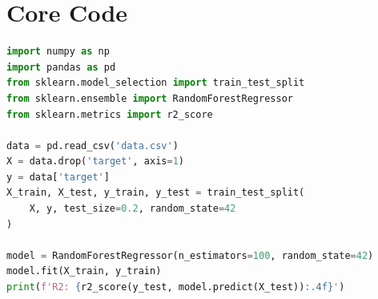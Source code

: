 \section{Core Code}


\begin{lstlisting}[language=Python]
import numpy as np
import pandas as pd
from sklearn.model_selection import train_test_split
from sklearn.ensemble import RandomForestRegressor
from sklearn.metrics import r2_score

data = pd.read_csv('data.csv')
X = data.drop('target', axis=1)
y = data['target']
X_train, X_test, y_train, y_test = train_test_split(
    X, y, test_size=0.2, random_state=42
)

model = RandomForestRegressor(n_estimators=100, random_state=42)
model.fit(X_train, y_train)
print(f'R2: {r2_score(y_test, model.predict(X_test)):.4f}')
\end{lstlisting}
